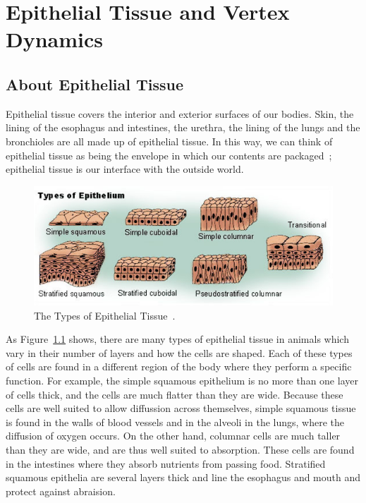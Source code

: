 \chapter{Epithelial Tissue and Vertex Dynamics}
\label{chap:intro}
\section{About Epithelial Tissue}
Epithelial tissue covers the interior and exterior surfaces of our bodies. Skin, the lining of the esophagus and intestines, the urethra, the lining of the lungs and the bronchioles are all made up of epithelial tissue. In this way, we can think of epithelial tissue as being the envelope in which our contents are packaged~\cite{ShapeFormation}; epithelial tissue is our interface with the outside world. 

\begin{figure}[hb]
\centering \includegraphics[width=\textwidth]{../diagrams/output.png}
\caption{The Types of Epithelial Tissue~\cite{Epithelium}.}
\label{fig:types}
\end{figure}

As Figure~\ref{fig:types} shows, there are many types of epithelial tissue in animals which vary in their number of layers and how the cells are shaped. Each of these types of cells are found in a different region of the body where they perform a specific function.  For example, the simple squamous epithelium is no more than one layer of cells thick, and the cells are much flatter than they are wide. Because these cells are well suited to allow diffussion across themselves, simple squamous tissue is found in the walls of blood vessels and in the alveoli in the lungs, where the diffusion of oxygen occurs. On the other hand, columnar cells are much taller than they are wide, and are thus well suited to absorption. These cells are found in the intestines where they absorb nutrients from passing food. Stratified squamous epithelia are several layers thick and line the esophagus and mouth and protect against abraision.

